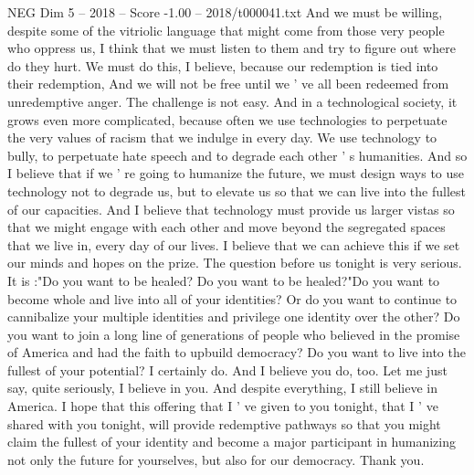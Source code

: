 \begin{textsample}{NEG Dim 5 – 2018 – Score -1.00 – 2018/t000041.txt}
And we must be willing, despite some of the vitriolic language that might come from those very people who oppress us, I think that we must listen to them and try to figure out where do they hurt.
We must do this, I believe, because our redemption is tied into their redemption, And we will not be free until we ' ve all been redeemed from unredemptive anger.
The challenge is not easy.
And in a technological society, it grows even more complicated, because often we use technologies to perpetuate the very values of racism that we indulge in every day.
We use technology to bully, to perpetuate hate speech and to degrade each other ' s humanities.
And so I believe that if we ' re going to humanize the future, we must design ways to use technology not to degrade us, but to elevate us so that we can live into the fullest of our capacities.
And I believe that technology must provide us larger vistas so that we might engage with each other and move beyond the segregated spaces that we live in, every day of our lives.
I believe that we can achieve this if we set our minds and hopes on the prize.
The question before us tonight is very serious.
It is :"Do you want to be healed?
Do you want to be healed?"Do you want to become whole and live into all of your identities?
Or do you want to continue to cannibalize your multiple identities and privilege one identity over the other?
Do you want to join a long line of generations of people who believed in the promise of America and had the faith to upbuild democracy?
Do you want to live into the fullest of your potential?
I certainly do.
And I believe you do, too.
Let me just say, quite seriously, I believe in you.
And despite everything, I still believe in America.
I hope that this offering that I ' ve given to you tonight, that I ' ve shared with you tonight, will provide redemptive pathways so that you might claim the fullest of your identity and become a major participant in humanizing not only the future for yourselves, but also for our democracy.
Thank you.

\end{textsample}
